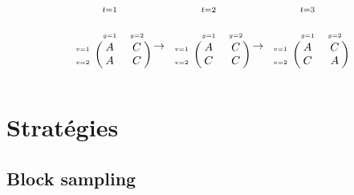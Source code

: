 \documentclass{beamer}
\newcommand{\fr}[1]{#1}
\newcommand{\en}[1]{}
\begin{document}
\begin{frame}
$$\overset{t=1}{\begin{blockarray}{ccc}
    &&\\&\scriptscriptstyle g=1&\scriptscriptstyle g=2\\
    \begin{block}{c(cc)}
 {\scriptscriptstyle v=1}&A&C\\   
  {\scriptscriptstyle v=2}&A&C\\   
    \end{block}
\end{blockarray}} \to \overset{t=2}{\begin{blockarray}{ccc}
    &&\\&\scriptscriptstyle g=1&\scriptscriptstyle g=2\\
    \begin{block}{c(cc)}
 {\scriptscriptstyle v=1}&A&C\\   
  {\scriptscriptstyle v=2}&C&C\\   
    \end{block}
\end{blockarray}} \to \overset{t=3}{\begin{blockarray}{ccc}
    &&\\&\scriptscriptstyle g=1&\scriptscriptstyle g=2\\
    \begin{block}{c(cc)}
 {\scriptscriptstyle v=1}&A&C\\   
  {\scriptscriptstyle v=2}&C&A\\   
    \end{block}
\end{blockarray}}$$
\end{frame}

\section{\en{Improvements}\fr{Stratégies}}






\subsection{Block sampling}
\end{document}
